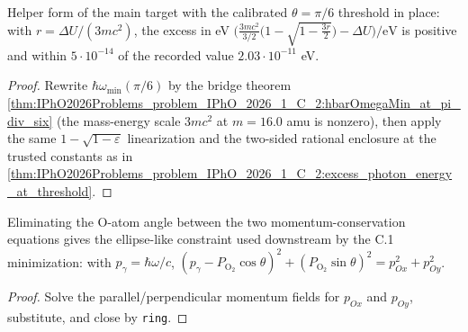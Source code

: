 \begin{theorem}
\label{thm:IPhO2026Problems_problem_IPhO_2026_1_C_2:excess_photon_energy_pi_div_six_form}
Helper form of the main target with the calibrated
$\theta = \pi/6$ threshold in place: with
$r = \Delta U/(3 m c^2)$, the excess in eV
$\bigl(\tfrac{3mc^2}{3/2}\bigl(1-\sqrt{1-\tfrac{3r}{2}}\bigr)
- \Delta U\bigr)/\mathrm{eV}$ is positive and within
$5{\cdot}10^{-14}$ of the recorded value $2.03{\cdot}10^{-11}$ eV.
\end{theorem}
\begin{proof}
Rewrite $\hbar\omega_{\min}(\pi/6)$ by the bridge theorem
\ref{thm:IPhO2026Problems_problem_IPhO_2026_1_C_2:hbarOmegaMin_at_pi_div_six}
(the mass-energy scale $3mc^2$ at $m = 16.0$ amu is nonzero), then apply the
same $1 - \sqrt{1-\varepsilon}$ linearization and the two-sided rational
enclosure at the trusted constants as in
\ref{thm:IPhO2026Problems_problem_IPhO_2026_1_C_2:excess_photon_energy_at_threshold}.
\end{proof}

\begin{lemma}
\label{lem:IPhO2026Problems_problem_IPhO_2026_1_C_2:momentum_balance_sq}
Eliminating the O-atom angle between the two momentum-conservation equations
gives the ellipse-like constraint used downstream by the C.1 minimization:
with $p_\gamma = \hbar\omega/c$,
$(p_\gamma - P_{\mathrm{O_2}}\cos\theta)^2 + (P_{\mathrm{O_2}}\sin\theta)^2
= p_{Ox}^2 + p_{Oy}^2$.
\end{lemma}
\begin{proof}
Solve the parallel/perpendicular momentum fields for $p_{Ox}$ and $p_{Oy}$,
substitute, and close by \texttt{ring}.
\end{proof}

